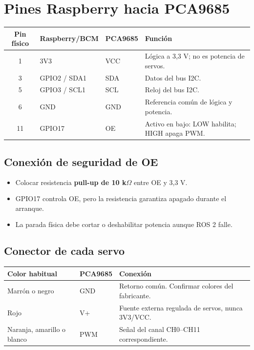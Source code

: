 \documentclass[11pt,a4paper]{article}
\begin{document}
\newpage
\section{Pines Raspberry hacia PCA9685}

\begin{tabularx}{\textwidth}{c l l X}
\toprule
\textbf{Pin físico} & \textbf{Raspberry/BCM} & \textbf{PCA9685} & \textbf{Función}\\
\midrule
1 & 3V3 & VCC & Lógica a 3,3 V; no es potencia de servos.\\
3 & GPIO2 / SDA1 & SDA & Datos del bus I2C.\\
5 & GPIO3 / SCL1 & SCL & Reloj del bus I2C.\\
6 & GND & GND & Referencia común de lógica y potencia.\\
11 & GPIO17 & OE & Activo en bajo: LOW habilita; HIGH apaga PWM.\\
\bottomrule
\end{tabularx}

\subsection{Conexión de seguridad de OE}

\begin{itemize}[leftmargin=7mm]
\item Colocar resistencia \textbf{pull-up de 10 k$\Omega$} entre OE y 3,3 V.
\item GPIO17 controla OE, pero la resistencia garantiza apagado durante el arranque.
\item La parada física debe cortar o deshabilitar potencia aunque ROS 2 falle.
\end{itemize}

\subsection{Conector de cada servo}

\begin{tabularx}{\textwidth}{l l X}
\toprule
\textbf{Color habitual} & \textbf{PCA9685} & \textbf{Conexión}\\
\midrule
Marrón o negro & GND & Retorno común. Confirmar colores del fabricante.\\
Rojo & V+ & Fuente externa regulada de servos, nunca 3V3/VCC.\\
Naranja, amarillo o blanco & PWM & Señal del canal CH0--CH11 correspondiente.\\
\bottomrule
\end{tabularx}
\end{document}
